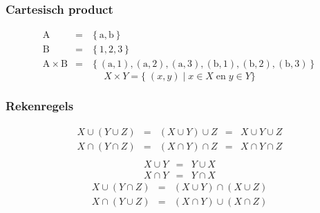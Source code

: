 \documentclass[dutch]{../khlslides}
\newcommand{\element}[3][]{
  \draw[fill=black] (#2) circle (.05);
  \node[anchor=south west,#1] at (#2) {#3};
}
\newcommand{\union}{\cup}
\newcommand{\intersect}{\cap}
\begin{document}
\begin{frame}
  \frametitle{Cartesisch product}
  \begin{center}
  \end{center}
  \[
    \begin{array}{rcl}
      \mathrm{A} & = & \left\{ \mathrm{a}, \mathrm{b} \right\} \\
      \mathrm{B} & = & \left\{ 1, 2, 3 \right\} \\
      \mathrm{A} \times \mathrm{B} & = & \left\{ ( \mathrm{a}, 1 ), (\mathrm{a}, 2 ), (\mathrm{a}, 3 ), ( \mathrm{b}, 1 ), (\mathrm{b}, 2 ), (\mathrm{b}, 3 ) \right\}
    \end{array}
  \]
  \vskip2mm
  \[
    X \times Y = \{ \; (x, y) \;|\; x \in X \;\mathrm{en}\; y \in Y \}
  \]
\end{frame}

\begin{frame}
  \frametitle{Rekenregels}
  \[
    \begin{array}{rclclr}
      X \union (Y \union Z) & = & (X \union Y) \union Z & = & X \union Y \union Z \\
      X \intersect (Y \intersect Z) & = & (X \intersect Y) \intersect Z & = & X \intersect Y \intersect Z \\
    \end{array}
  \]
  \[
    \begin{array}{rcl}
      X \union Y & = & Y \union X \\
      X \intersect Y & = & Y \intersect X
    \end{array}
  \]
  \[
    \begin{array}{rcl}
      X \union (Y \intersect Z) & = & (X \union Y) \intersect (X \union Z) \\
      X \intersect (Y \union Z) & = & (X \intersect Y) \union (X \intersect Z) \\
    \end{array}
  \]
\end{frame}
\end{document}
